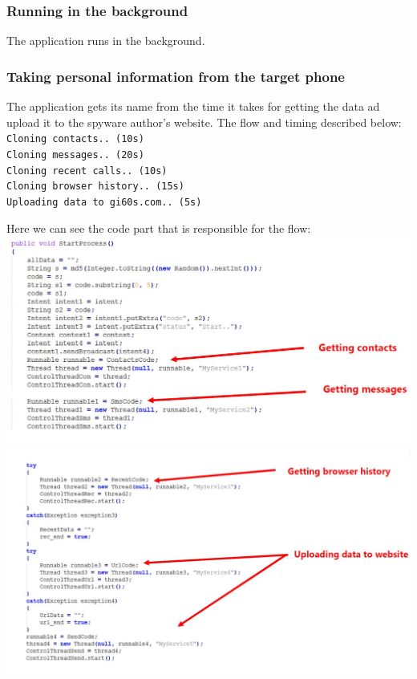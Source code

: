 \subsubsection{Running in the background}
The application runs in the background.

\subsubsection{Taking personal information from the target phone}
\parbox{\textwidth}{
The application gets its name from the time it takes for getting the data ad upload it to the spyware author's website. The flow and timing described below: \\
\texttt{Cloning contacts.. (10s)} \\
\texttt{Cloning messages.. (20s)} \\
\texttt{Cloning recent calls.. (10s)} \\
\texttt{Cloning browser history.. (15s)} \\
\texttt{Uploading data to gi60s.com.. (5s)}
}

\parbox{\textwidth}{
Here we can see the code part that is responsible for the flow: \\
\includegraphics[width=\textwidth]{figs/gone60_6.JPG} \\
\includegraphics[width=\textwidth]{figs/gone60_6_2.JPG}
}


